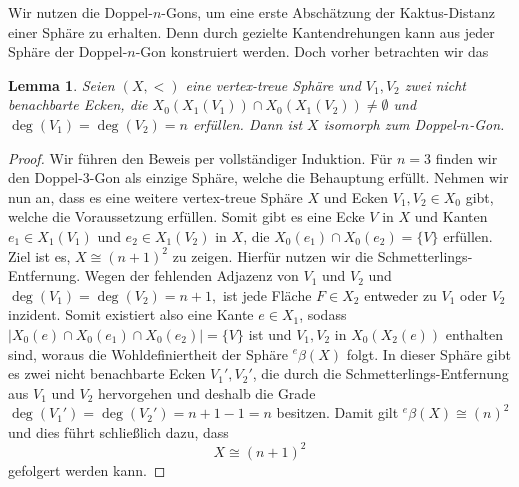 \documentclass[12pt,titlepage,twoside,cleardoublepage]{article}
\theoremstyle{nummermitklammern}
\newtheorem{lemma}[temp]{Lemma}
\newtheorem{lemma}[zahl]{Lemma}
\numberwithin{equation}{section}
\begin{document}
Wir nutzen die Doppel-$n$-Gons, um eine erste Abschätzung der Kaktus-Distanz einer Sphäre zu erhalten. Denn durch gezielte Kantendrehungen kann aus jeder Sphäre der Doppel-$n$-Gon konstruiert werden. Doch vorher betrachten wir das 

\begin{lemma}\label{ngon}
Seien $(X,<)$ eine vertex-treue Sphäre und $V_1,V_2$ zwei nicht benachbarte Ecken, die  $X_0(X_1(V_1))\cap X_0(X_1(V_2))\neq \emptyset$ und $\deg(V_1)=\deg(V_2)= n$ erfüllen. Dann ist $X$ isomorph zum Doppel-$n$-Gon.
\end{lemma}
\begin{proof}
Wir  führen den Beweis per vollständiger Induktion. Für $n=3$ finden wir den Doppel-3-Gon als einzige Sphäre, welche die Behauptung erfüllt. Nehmen wir nun an, dass es eine weitere vertex-treue Sphäre $X$ und Ecken $V_1,V_2\in X_0$ gibt, welche die Voraussetzung erfüllen. Somit gibt es eine Ecke $V$ in $X$ und Kanten $e_1\in X_1(V_1)$ und $e_2 \in X_1(V_2)$ in $X$, die $X_0(e_1)\cap X_0(e_2)=\{V\}$ erfüllen.
 Ziel ist es, $X\cong (n+1)^2$ zu zeigen. Hierfür nutzen wir die Schmetterlings-Entfernung. Wegen der fehlenden Adjazenz von $V_1$ und $V_2$ und $\deg(V_1)=\deg(V_2)= n+1,$ ist jede Fläche $F\in X_2$ entweder zu $V_1$ oder $V_2$ inzident. Somit existiert also eine Kante $e\in X_1$, sodass $\vert X_0(e)\cap X_0(e_1)\cap X_0(e_2)\vert  =\{V\}$
 ist und $V_1,V_2$ in $X_0(X_2(e))$ enthalten sind, woraus die Wohldefiniertheit der Sphäre ${{}^e\beta(X)}$ folgt. In dieser Sphäre gibt es zwei nicht benachbarte Ecken $V_1',V_2'$, die durch die Schmetterlings-Entfernung aus $V_1$ und $V_2$ hervorgehen und deshalb die Grade $\deg(V_1')=\deg(V_2')=n+1-1=n$ besitzen. Damit gilt ${{}^e\beta(X)}\cong (n)^2$ und dies führt schließlich dazu, dass 
 \[
X\cong (n+1)^2 
 \]
 gefolgert werden kann.
\end{proof}
\end{document}
